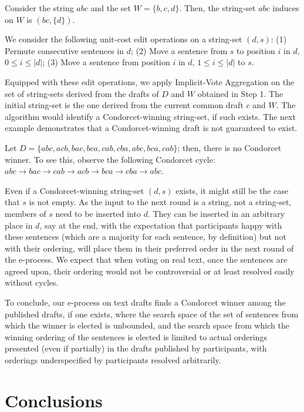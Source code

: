 \documentclass[sigconf]{aamas}  %
\begin{document}
\begin{example}
%
Consider the string $abc$ and the set $W = \{b, c, d\}$.
Then, the string-set $abc$ induces on $W$ is  $(bc,\{d\})$.
%
\end{example}

We consider the following unit-cost edit operations on a string-set $(d,s)$:
(1) Permute consecutive sentences in $d$;
(2) Move a sentence from $s$ to position $i$ in $d$, $0 \le i \le |d|$;
(3) Move a sentence from position $i$ in $d$, $1 \le i \le |d|$ to $s$.

Equipped with these edit operations,
we apply Implicit-Vote Aggregation on the set of string-sets derived from the drafts of $D$ and $W$ obtained in Step 1.  The initial string-set is the one derived from the current common draft $c$ and $W$.  The algorithm would identify a Condorcet-winning string-set, if such exists.
%
The next example demonstrates that a Condorcet-winning draft is not guaranteed to exist.

\begin{example}
%
Let $D = \{abc, acb, bac, bca, cab, cba, abc, bca, cab\}$; then, there is no Condorcet winner. To see this, observe the following Condorcet cycle: $abc \to bac \to cab \to acb \to bca \to cba \to abc$.
%
\end{example}

Even if a Condorcet-winning string-set $(d,s)$ exists, it might still be the case that $s$ is not empty.  As the input to the next round is a string, not a string-set, members of $s$ need to be inserted into $d$.  They can be inserted in an arbitrary place in $d$, say at the end, with the expectation that participants happy with these sentences (which are  a majority for each sentence, by definition) but not with their ordering, will place them in their preferred order in the next round of the e-process. We expect that when voting on real text, once the sentences are agreed upon, their ordering would not be controversial or at least resolved easily without cycles.  

To conclude, our e-process on text drafts finds a Condorcet winner among the published drafts, if one exists, where the search space of the set of sentences from which the winner is elected is unbounded, and the search space from which the winning ordering of the sentences is elected is limited to actual orderings presented (even if partially) in the drafts published by participants, with orderings underspecified by participants resolved arbitrarily.


\section{Conclusions}
\label{section:conclusions}
\end{document}
